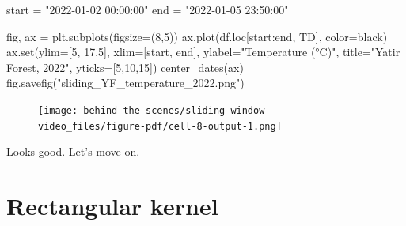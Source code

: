 \documentclass[
  letterpaper,
  DIV=11,
  numbers=noendperiod,
  oneside]{scrreprt}
\newenvironment{Shaded}{\begin{snugshade}}{\end{snugshade}}
\newcommand{\BuiltInTok}[1]{\textcolor[rgb]{0.00,0.23,0.31}{#1}}
\newcommand{\DecValTok}[1]{\textcolor[rgb]{0.68,0.00,0.00}{#1}}
\newcommand{\FloatTok}[1]{\textcolor[rgb]{0.68,0.00,0.00}{#1}}
\newcommand{\NormalTok}[1]{\textcolor[rgb]{0.00,0.23,0.31}{#1}}
\newcommand{\OperatorTok}[1]{\textcolor[rgb]{0.37,0.37,0.37}{#1}}
\newcommand{\StringTok}[1]{\textcolor[rgb]{0.13,0.47,0.30}{#1}}
\begin{document}
\begin{Shaded}
\begin{Highlighting}[]
\NormalTok{start }\OperatorTok{=} \StringTok{"2022{-}01{-}02 00:00:00"}
\NormalTok{end }\OperatorTok{=} \StringTok{"2022{-}01{-}05 23:50:00"}
\end{Highlighting}
\end{Shaded}

\begin{Shaded}
\begin{Highlighting}[]
\NormalTok{fig, ax }\OperatorTok{=}\NormalTok{ plt.subplots(figsize}\OperatorTok{=}\NormalTok{(}\DecValTok{8}\NormalTok{,}\DecValTok{5}\NormalTok{))}
\NormalTok{ax.plot(df.loc[start:end, }\StringTok{\textquotesingle{}TD\textquotesingle{}}\NormalTok{], color}\OperatorTok{=}\StringTok{\textquotesingle{}black\textquotesingle{}}\NormalTok{)}
\NormalTok{ax.}\BuiltInTok{set}\NormalTok{(ylim}\OperatorTok{=}\NormalTok{[}\DecValTok{5}\NormalTok{, }\FloatTok{17.5}\NormalTok{],}
\NormalTok{       xlim}\OperatorTok{=}\NormalTok{[start, end],}
\NormalTok{       ylabel}\OperatorTok{=}\StringTok{"Temperature (°C)"}\NormalTok{,}
\NormalTok{       title}\OperatorTok{=}\StringTok{"Yatir Forest, 2022"}\NormalTok{,}
\NormalTok{       yticks}\OperatorTok{=}\NormalTok{[}\DecValTok{5}\NormalTok{,}\DecValTok{10}\NormalTok{,}\DecValTok{15}\NormalTok{])}
\NormalTok{center\_dates(ax)}
\NormalTok{fig.savefig(}\StringTok{"sliding\_YF\_temperature\_2022.png"}\NormalTok{)}
\end{Highlighting}
\end{Shaded}

\begin{figure}[H]

{\centering \texttt{[image: behind-the-scenes/sliding-window-video\_files/figure-pdf/cell-8-output-1.png]}

}

\end{figure}

Looks good. Let's move on.

\hypertarget{rectangular-kernel}{%
\section{Rectangular kernel}\label{rectangular-kernel}}
\end{document}
